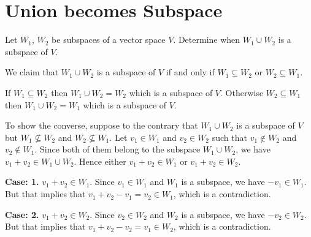 \documentclass[11pt, a4paper, abstract=true]{scrartcl}
\begin{document}

\newpage

\section{Union becomes Subspace}

\begin{problem*}
    Let \(W_1\), \(W_2\) be subspaces of a vector space \(V\). Determine when \(W_1 \cup W_2\) is a subspace of \(V\).
\end{problem*}
\begin{soln}
    We claim that \(W_1 \cup W_2\) is a subspace of \(V\) if and only if \(W_1 \subseteq W_2\) or \(W_2 \subseteq W_1\). 

    If \(W_1 \subseteq W_2\) then \(W_1 \cup W_2 = W_2\) which is a subspace of \(V\). Otherwise \(W_2 \subseteq W_1\) then \(W_1 \cup W_2 = W_1\) which is a subspace of \(V\).

    To show the converse, suppose to the contrary that \(W_1 \cup W_2\) is a subspace of \(V\) but \(W_1 \nsubseteq W_2\) and \(W_2 \nsubseteq W_1\). Let \(v_1 \in W_1\) and \(v_2 \in W_2\) such that \(v_1 \notin W_2\) and \(v_2 \notin W_1\). Since both of them belong to the subspace \(W_1 \cup W_2\), we have \(v_1 + v_2 \in W_1 \cup W_2\). Hence either \(v_1 + v_2 \in W_1\) or \(v_1 + v_2 \in W_2\). 

    \noindent\textbf{Case: 1.} \(v_1 + v_2 \in W_1\). Since \(v_1 \in W_1\) and \(W_1\) is a subspace, we have \(-v_1 \in W_1\). But that implies that \(v_1 + v_2 - v_1 = v_2 \in W_1\), which is a contradiction.

    \noindent\textbf{Case: 2.} \(v_1 + v_2 \in W_2\). Since \(v_2 \in W_2\) and \(W_2\) is a subspace, we have \(-v_2 \in W_2\). But that implies that \(v_1 + v_2 - v_2 = v_1 \in W_2\), which is a contradiction.
\end{soln}
\end{document}
